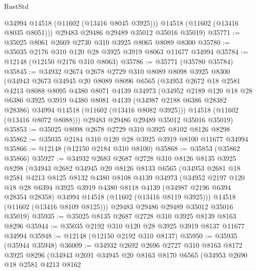 \begin{lexlean}{RustStd}
\begin{coremodule}
          @34994
          @14518
          (@11602 (@13416 @8045 @3925)))
        @14518
        (@11602 (@13416 @8035 @8051)))
      @29483
      @29486
      @29489
      @35012
      @35016
      @35019)
@35771 := @35025 @8061 @2669 @2730 @310 @3925 @8065 @8089 @8300
@35780 := @35035 @2176 @310 @120 @28 @3925 @3919 @8063 @11677 @34994
@35784 := @12148 (@12150 @2176 @310 @8063)
@35786 := @35771 (@35780 @35784)
@35845 := @34932
    @2674
    @2678
    @2729
    @310
    @8089
    @8098
    @3925
    @8300
    (@34943
      @2673
      @34945
      @20
      @8089
      @8096
      @6565
      (@34953
        @2672
        @18
        @2581
        @4213
        @8088
        @8095
        @4380
        @8071
        @4139
        @34973
        (@34952
          @2189
          @120
          @18
          @28
          @6386
          @3925
          @3919
          @4380
          @8081
          @4139
          (@34987 @2188 @6386 @28382 @28386)
          @34994
          @14518
          (@11602 (@13416 @8082 @3925)))
        @14518
        (@11602 (@13416 @8072 @8088)))
      @29483
      @29486
      @29489
      @35012
      @35016
      @35019)
@35853 := @35025 @8098 @2678 @2729 @310 @3925 @8102 @8126 @8298
@35862 := @35035 @2184 @310 @120 @28 @3925 @3919 @8100 @11677 @34994
@35866 := @12148 (@12150 @2184 @310 @8100)
@35868 := @35853 (@35862 @35866)
@35927 := @34932
    @2683
    @2687
    @2728
    @310
    @8126
    @8135
    @3925
    @8298
    (@34943
      @2682
      @34945
      @20
      @8126
      @8133
      @6565
      (@34953
        @2681
        @18
        @2581
        @4213
        @8125
        @8132
        @4380
        @8108
        @4139
        @34973
        (@34952
          @2197
          @120
          @18
          @28
          @6394
          @3925
          @3919
          @4380
          @8118
          @4139
          (@34987 @2196 @6394 @28354 @28358)
          @34994
          @14518
          (@11602 (@13416 @8119 @3925)))
        @14518
        (@11602 (@13416 @8109 @8125)))
      @29483
      @29486
      @29489
      @35012
      @35016
      @35019)
@35935 := @35025 @8135 @2687 @2728 @310 @3925 @8139 @8163 @8296
@35944 := @35035 @2192 @310 @120 @28 @3925 @3919 @8137 @11677 @34994
@35948 := @12148 (@12150 @2192 @310 @8137)
@35950 := @35935 (@35944 @35948)
@36009 := @34932
    @2692
    @2696
    @2727
    @310
    @8163
    @8172
    @3925
    @8296
    (@34943
      @2691
      @34945
      @20
      @8163
      @8170
      @6565
      (@34953
        @2690
        @18
        @2581
        @4213
        @8162

\end{coremodule}
\end{lexlean}
